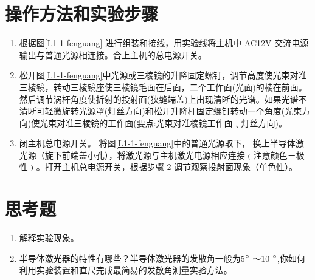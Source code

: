 \documentclass{zjureport}
\begin{document}
\section{操作方法和实验步骤}

	
	\begin{enumerate}
		\item{
			根据图\ref{L1-1-fenguang} 进行组装和接线，用实验线将主机中 AC12V 交流电源输出与普通光源相连接。合上主机的总电源开关。}
		\item{
			松开图\ref{L1-1-fenguang}中光源或三棱镜的升降固定螺钉，调节高度使光束对准三棱镜，转动三棱镜座使三棱镜毛面在后面，二个工作面(光面)的棱在前面。然后调节涡杆角度使折射的投射面(狭缝端盖)上出现清晰的光谱。如果光谱不清晰可轻微旋转光源罩(灯丝方向)和松开升降杆固定螺钉转动一个角度(光束方向)使光束对准三棱镜的工作面(要点:光束对准棱镜工作面﹑灯丝方向)。}
		\item{
			闭主机总电源开关。 将图\ref{L1-1-fenguang}中的普通光源取下， 换上半导体激光源（旋下前端盖小孔），将激光源与主机激光电源相应连接﹙注意颜色－极性﹚。打开主机总电源开关，根据步骤 2 调节观察投射面现象（单色性）。
					}
	\end{enumerate}

\section{思考题}
	\begin{enumerate}
	\item{解释实验现象。}
	\item{半导体激光器的特性有哪些？半导体激光器的发散角一般为5$^\circ$ ～10 $^\circ$,你如何利用实验装置和直尺完成最简易的发散角测量实验方法。}
	\end{enumerate}
\end{document}
